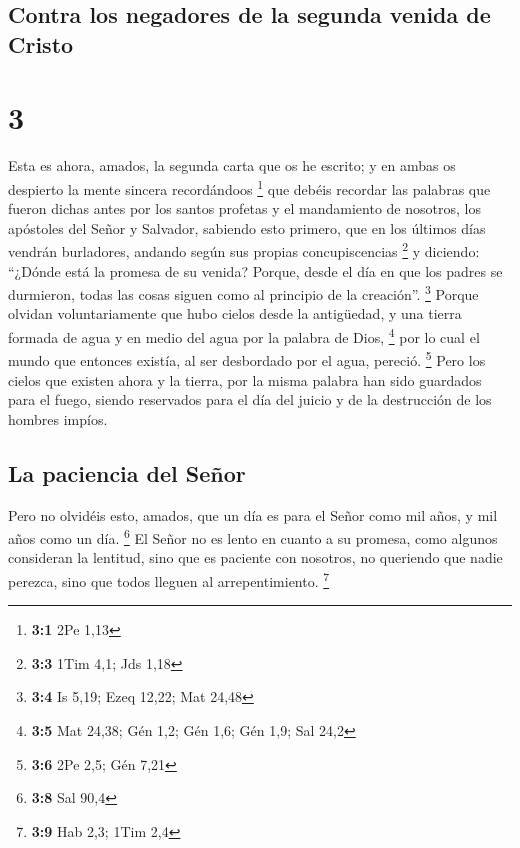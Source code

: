 \hypertarget{contra-los-negadores-de-la-segunda-venida-de-cristo}{%
\subsection{Contra los negadores de la segunda venida de
Cristo}\label{contra-los-negadores-de-la-segunda-venida-de-cristo}}

\hypertarget{section-2}{%
\section{3}\label{section-2}}

 Esta es ahora, amados, la segunda carta que os he
escrito; y en ambas os despierto la mente sincera recordándoos
\footnote{\textbf{3:1} 2Pe 1,13}  que debéis recordar las
palabras que fueron dichas antes por los santos profetas y el
mandamiento de nosotros, los apóstoles del Señor y Salvador,
 sabiendo esto primero, que en los últimos días vendrán
burladores, andando según sus propias concupiscencias \footnote{\textbf{3:3}
  1Tim 4,1; Jds 1,18}  y diciendo: ``¿Dónde está la
promesa de su venida? Porque, desde el día en que los padres se
durmieron, todas las cosas siguen como al principio de la creación''.
\footnote{\textbf{3:4} Is 5,19; Ezeq 12,22; Mat 24,48} 
Porque olvidan voluntariamente que hubo cielos desde la antigüedad, y
una tierra formada de agua y en medio del agua por la palabra de Dios,
\footnote{\textbf{3:5} Mat 24,38; Gén 1,2; Gén 1,6; Gén 1,9; Sal 24,2}
 por lo cual el mundo que entonces existía, al ser
desbordado por el agua, pereció. \footnote{\textbf{3:6} 2Pe 2,5; Gén
  7,21}  Pero los cielos que existen ahora y la tierra,
por la misma palabra han sido guardados para el fuego, siendo reservados
para el día del juicio y de la destrucción de los hombres impíos.

\hypertarget{la-paciencia-del-seuxf1or}{%
\subsection{La paciencia del Señor}\label{la-paciencia-del-seuxf1or}}

 Pero no olvidéis esto, amados, que un día es para el
Señor como mil años, y mil años como un día. \footnote{\textbf{3:8} Sal
  90,4}  El Señor no es lento en cuanto a su promesa, como
algunos consideran la lentitud, sino que es paciente con nosotros, no
queriendo que nadie perezca, sino que todos lleguen al arrepentimiento.
\footnote{\textbf{3:9} Hab 2,3; 1Tim 2,4}

